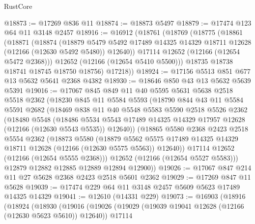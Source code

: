\begin{lexlean}{RustCore}
\begin{coremodule}
@18873 := @17269 @836 @11
@18874 := @18873 @5497
@18879 := @17474 @123 @64 @11 @3148 @2457
@18916 := @16912
    (@18761
      (@18769
        (@18775
          (@18861
            (@18871
              (@18874
                (@18879
                  @5479
                  @5492
                  @17489
                  @14325
                  @14329
                  @18711
                  @12628
                  (@12166 (@12630 @5492 @5480))
                  @12640))
              @17114
              @12652
              (@12166 (@12654 @5472 @2368)))
            @12652
            (@12166 (@12654 @5410 @5500)))
          @18735
          @18738
          @18741
          @18745
          @18750
          @18756)
        @17218))
@18924 := @17156 @5513 @851 @677 @13 @5632 @5641 @2368 @4382
@18930 := @18646 @850 @43 @13 @5632 @5639 @5391
@19016 := @17067
    @845
    @849
    @11
    @40
    @5595
    @5631
    @5638
    @2518
    @5518
    @2362
    (@18230
      @845
      @11
      @5584
      @5593
      (@18790
        @844
        @43
        @11
        @5584
        @5591
        @2682
        (@18469
          @838
          @11
          @40
          @5548
          @5583
          @5590
          @2518
          @5526
          @2362
          (@18480
            @5548
            (@18486
              @5534
              @5543
              @17489
              @14325
              @14329
              @17957
              @12628
              (@12166 (@12630 @5543 @5535))
              @12640))
          (@18865
            @5580
            @2368
            @2423
            @2518
            @5554
            @2362
            (@18873
              @5580
              (@18879
                @5562
                @5575
                @17489
                @14325
                @14329
                @18711
                @12628
                (@12166 (@12630 @5575 @5563))
                @12640))
            @17114
            @12652
            (@12166 (@12654 @5555 @2368)))
          @12652
          (@12166 (@12654 @5527 @5583)))
        @12879
        @12882
        @12885
        @12889
        @12894
        @12900))
@19026 := @17067 @847 @214 @11 @27 @5628 @2368 @2423 @2518 @5601 @2362
@19029 := @17269 @847 @11 @5628
@19039 := @17474 @229 @64 @11 @3148 @2457 @5609 @5623 @17489 @14325 @14329
@19041 := @12610 (@14331 @229)
@19073 := @16903
    (@18916
      (@18924
        (@18930
          (@19016
            (@19026
              (@19029 (@19039 @19041 @12628 (@12166 (@12630 @5623 @5610)) @12640))
              @17114

\end{coremodule}
\end{lexlean}
